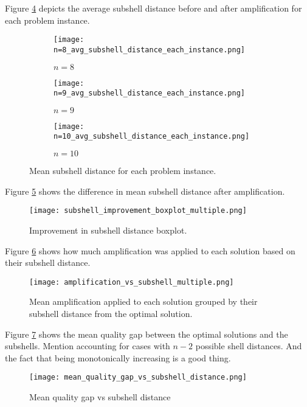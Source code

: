 Figure \ref{fig:avg sub} depicts the average subshell distance before and after amplification for each problem instance.
\begin{figure}[htbp]
     \centering
     \begin{subfigure}{0.45\textwidth}
         \centering
         \texttt{[image: n=8\_avg\_subshell\_distance\_each\_instance.png]}
         \caption{$n=8$}
         \label{fig:avg sub 8}
     \end{subfigure}
     \hfill
     \begin{subfigure}{0.45\textwidth}
         \centering
         \texttt{[image: n=9\_avg\_subshell\_distance\_each\_instance.png]}
         \caption{$n=9$}
         \label{fig:avg sub 9}
     \end{subfigure}
     \hfill
     \begin{subfigure}{\textwidth}
         \centering
         \texttt{[image: n=10\_avg\_subshell\_distance\_each\_instance.png]}
         \caption{$n=10$}
         \label{fig:avg sub 10}
     \end{subfigure}
        \caption{Mean subshell distance for each problem instance.}
        \label{fig:avg sub}
\end{figure}

Figure \ref{fig:sub improvement} shows the difference in mean subshell distance after amplification.
\begin{figure}[htbp]
    \centering
    \texttt{[image: subshell\_improvement\_boxplot\_multiple.png]}
    \caption{Improvement in subshell distance boxplot.}
    \label{fig:sub improvement}
\end{figure}

Figure \ref{fig:amp vs sub} shows how much amplification was applied to each solution based on their subshell distance.
\begin{figure}[htbp]
    \centering
    \texttt{[image: amplification\_vs\_subshell\_multiple.png]}
    \caption{Mean amplification applied to each solution grouped by their subshell distance from the optimal solution.}
    \label{fig:amp vs sub}
\end{figure}

Figure \ref{fig:mqg} shows the mean quality gap between the optimal solutions and the subshells. Mention accounting for cases with $n-2$ possible shell distances. And the fact that being monotonically increasing is a good thing.
\begin{figure}[htbp]
    \centering
    \texttt{[image: mean\_quality\_gap\_vs\_subshell\_distance.png]}
    \caption{Mean quality gap vs subshell distance}
    \label{fig:mqg}
\end{figure}

